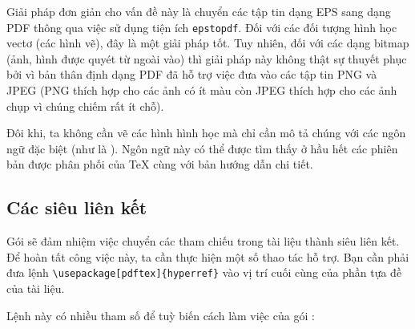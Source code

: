 Giải pháp đơn giản cho vấn đề này là chuyển các tập tin dạng EPS sang dạng PDF thông qua việc sử dụng tiện ích \texttt{epstopdf}. Đối với các đối tượng hình học vectơ (các hình vẽ), đây là một giải pháp tốt. Tuy nhiên, đối với các dạng bitmap (ảnh, hình được quyét từ ngoài vào) thì giải pháp này không thật sự thuyết phục bởi vì bản thân định dạng PDF đã hỗ trợ việc đưa vào các tập tin PNG và JPEG (PNG thích hợp cho các ảnh có ít màu còn JPEG thích hợp cho các ảnh chụp vì chúng chiếm rất ít chỗ).

Đôi khi, ta không cần vẽ các hình hình học mà chỉ cần mô tả chúng với các ngôn ngữ đặc biệt (như là \MP{}). Ngôn ngữ này có thể được tìm thấy ở hầu hết các phiên bản được phân phối
của \TeX{} cùng với bản hướng dẫn chi tiết.

\subsection{Các siêu liên kết}
\label{ssec:pdfhyperref} Gói  sẽ đảm nhiệm việc chuyển các tham chiếu trong tài liệu thành siêu liên kết. Để hoàn tất công việc này, ta cần thực hiện một số thao tác hỗ trợ. Bạn cần phải đưa lệnh \verb+\usepackage[pdftex]{hyperref}+ vào vị trí cuối cùng của phần tựa đề của tài liệu.

Lệnh này có nhiều tham số để tuỳ biến cách làm việc của gói :

